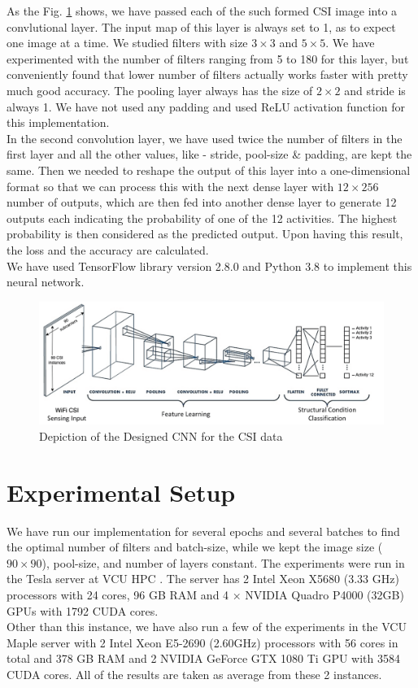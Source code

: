 \documentclass[conference]{IEEEtran}
\begin{document}
As the Fig. \ref{fig_csi_cnn} shows, we have passed each of the such formed CSI image into a convlutional layer. The input map of this layer is always set to 1, as to expect one image at a time. We studied filters with size $3\times3$ and $5\times5$. We have experimented with the number of filters ranging from 5 to 180 for this layer, but conveniently found that lower number of filters actually works faster with pretty much good accuracy. The pooling layer always has the size of $2\times2$ and stride is always 1. We have not used any padding and used ReLU activation function for this implementation.\\
In the second convolution layer, we have used twice the number of filters in the first layer and all the other values, like - stride, pool-size \& padding, are kept the same. Then we needed to reshape the output of this layer into a one-dimensional format so that we can process this with the next dense layer with $12\times256$ number of outputs, which are then fed into another dense layer to generate 12 outputs each indicating the probability of one of the 12 activities. The highest probability is then considered as the predicted output. Upon having this result, the loss and the accuracy are calculated.\\
We have used TensorFlow library version 2.8.0 and Python 3.8 to implement this neural network. 

\begin{figure}[htbp]
\centerline{\includegraphics[scale=0.4]{images/csi_cnn.png}}
\caption{Depiction of the Designed CNN for the CSI data}
\label{fig_csi_cnn}
\end{figure}


\section{Experimental Setup}
We have run our implementation for several epochs and several batches to find the optimal number of filters and batch-size, while we kept the image size ($90\times90$), pool-size, and number of layers constant. The experiments were run in the Tesla server at VCU HPC \cite{vcu_hpc}. The server has 2 Intel Xeon X5680 (3.33 GHz) processors with 24 cores, 96 GB RAM and 4 × NVIDIA Quadro P4000 (32GB) GPUs with 1792 CUDA cores.\\
Other than this instance, we have also run a few of the experiments in the VCU Maple server with 2 Intel Xeon E5-2690 (2.60GHz) processors with 56 cores in total and 378 GB RAM and 2 NVIDIA GeForce GTX 1080 Ti GPU with 3584 CUDA cores. All of the results are taken as average from these 2 instances. 
\end{document}
